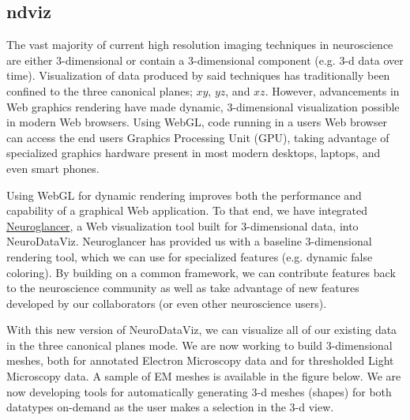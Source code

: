 \documentclass[simplex.tex]{subfiles}
\begin{document}
\subsection[ndviz]{ndviz}

The vast majority of current high resolution imaging techniques in neuroscience are either 3-dimensional or contain a 3-dimensional component (e.g. 3-d data over time). Visualization of data produced by said techniques has traditionally been confined to the three canonical planes; $xy$, $yz$, and $xz$. However, advancements in Web graphics rendering have made dynamic, 3-dimensional visualization possible in modern Web browsers. Using WebGL, code running in a users Web browser can access the end users Graphics Processing Unit (GPU), taking advantage of specialized graphics hardware present in most modern desktops, laptops, and even smart phones. 

Using WebGL for dynamic rendering improves both the performance and capability of a graphical Web application. To that end, we have integrated \href{https://github.com/google/neuroglancer}{Neuroglancer}, a Web visualization tool built for 3-dimensional data, into NeuroDataViz. Neuroglancer has provided us with a baseline 3-dimensional rendering tool, which we can use for specialized features (e.g. dynamic false coloring). By building on a common framework, we can contribute features back to the neuroscience community as well as take advantage of new features developed by our collaborators (or even other neuroscience users). 

With this new version of NeuroDataViz, we can visualize all of our existing data in the three canonical planes mode. We are now working to build 3-dimensional meshes, both for annotated Electron Microscopy data and for thresholded Light Microscopy data. A sample of EM meshes is available in the figure below. We are now developing tools for automatically generating 3-d meshes (shapes) for both datatypes on-demand as the user makes a selection in the 3-d view.  
\end{document}
